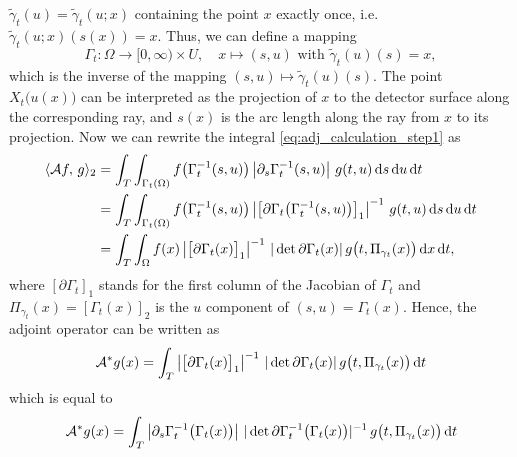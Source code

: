 \documentclass{amsart}
\begin{document}
$\tilde \gamma_t(u) = \tilde \gamma_t(u; x)$ containing the point $x$ exactly once, i.e. $\tilde \gamma_t(u; x)(s(x)) = x$. Thus, we can 
define a 
mapping
%
\begin{equation*}
 \Gamma_t: \Omega \to [0, \infty) \times U,\quad x \mapsto (s, u) \text{ with } \tilde \gamma_t(u)(s) = x,
\end{equation*}
%
which is the inverse of the mapping $(s,u) \mapsto \tilde \gamma_t(u)(s)$. The point $X_t\big(u(x)\big)$ can be interpreted as the 
projection of 
$x$ to the detector surface along the corresponding ray, and $s(x)$ is the arc length along the ray from $x$ to its projection. 
Now we can rewrite the integral \eqref{eq:adj_calculation_step1} as
%
\begin{align*}
 \langle {\ensuremath{\mathcal{A}}} f,\,g\rangle_2
 &= \int_T \int_{\Gamma_t(\Omega)} f\big(\Gamma_t^{-1}(s,u)\big) \left| \partial_s \Gamma_t^{-1}(s,u) \right|\, g(t, u)\, \mathrm{d} s\, \mathrm{d} u\, 
 \mathrm{d} t  \\
 &= \int_T \int_{\Gamma_t(\Omega)} f\big(\Gamma_t^{-1}(s,u)\big) \left| \big[\partial \Gamma_t\big(\Gamma_t^{-1}(s,u)\big)\big]_1 \right|^{-1}\, 
 g(t, u)\, \mathrm{d}  s\, \mathrm{d} u\, \mathrm{d} t \\
 &= \int_T \int_\Omega f(x) \left| \big[\partial \Gamma_t(x)\big]_1 \right|^{-1}\, |\operatorname*{det}{\partial \Gamma_t(x)}|\, 
 g\big(t, \Pi_{\gamma_t}(x)\big)
 \, \mathrm{d} x\, \mathrm{d} t,
\end{align*}
%
where $[\partial \Gamma_t]_1$ stands for the first column of the Jacobian of $\Gamma_t$ and $\Pi_{\gamma_t}(x) = [\Gamma_t(x)]_2$ is the 
$u$ 
component of $(s, u) = \Gamma_t(x)$. Hence, the adjoint operator can be written as
%
\begin{equation}
 \label{eq:adj_op_onedir}
 {\ensuremath{{\mathcal{A}}^*}} g(x) = \int_T \left| \big[\partial \Gamma_t(x)\big]_1 \right|^{-1}\, |\operatorname*{det}{\partial \Gamma_t(x)}|\, g\big(t, 
\Pi_{\gamma_t}(x)\big)\, 
 \mathrm{d} t
\end{equation}
%
which is equal to
%
\begin{equation}
 \label{eq:adj_op_onedir_alt}
 {\ensuremath{{\mathcal{A}}^*}} g(x) = \int_T \left| \partial_s \Gamma_t^{-1}\big(\Gamma_t(x)\big) \right|\, 
 |\operatorname*{det}{\partial \Gamma_t^{-1}\big(\Gamma_t(x)\big)}|^{-1}\, g\big(t, \Pi_{\gamma_t}(x)\big)\, \mathrm{d} t
\end{equation}
%
%
\end{document}
